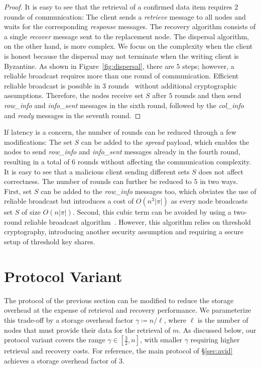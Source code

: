 \documentclass[sigconf,screen]{acmart}
\begin{document}
\begin{proof}
It is easy to see that the retrieval of a confirmed data item requires $2$ rounds of communication: The client sends a \emph{retrieve} message to all nodes and waits for the corresponding \emph{response} messages. The recovery algorithm consists of a single \emph{recover} message sent to the replacement node. The dispersal algorithm, on the other hand, is more complex. We focus on the complexity when the client is honest because the dispersal may not terminate when the writing client is Byzantine. As shown in Figure~\ref{fig:dispersal}, there are $5$ steps; however, a reliable broadcast requires more than one round of communication. Efficient reliable broadcast is possible in $3$ rounds~\cite{cachin2005, locher2024} without additional cryptographic assumptions. Therefore, the nodes receive set $S$ after $5$ rounds and then send \emph{row\_info} and \emph{info\_sent} messages in the sixth round, followed by the \emph{col\_info} and \emph{ready} messages in the seventh round.
\end{proof}

If latency is a concern, the number of rounds can be reduced through a few modifications: The set $S$ can be added to the \emph{spread} payload, which enables the nodes to send \emph{row\_info} and \emph{info\_sent} messages already in the fourth round, resulting in a total of $6$ rounds without affecting the communication complexity. It is easy to see that a malicious client sending different sets $S$ does not affect correctness.
The number of rounds can further be reduced to $5$ in two ways. First, set $S$ can be added to the \emph{row\_info} messages too, which obviates the use of reliable broadcast but introduces a cost of $O(n^3|\pi|)$ as every node broadcasts set $S$ of size $O(n|\pi|)$. Second, this cubic term can be avoided by using a two-round reliable broadcast algorithm~\cite{abraham2021, locher2024}. However, this algorithm relies on threshold cryptography, introducing another security assumption and requiring a secure setup of threshold key shares.

\section{Protocol Variant}
\label{sec:avid_msr}

The protocol of the previous section can be modified to reduce the storage overhead at the expense of retrieval and recovery performance. We parameterize this trade-off by a storage overhead factor $\gamma \coloneqq n/\ell$, where $\ell$ is the number of nodes that must provide their data for the retrieval of $m$. As discussed below, our protocol variant covers the range $\gamma \in [\frac{3}{2}, n]$, with smaller $\gamma$ requiring higher retrieval and recovery costs.
For reference, the main protocol of \S\ref{sec:avid} achieves a storage overhead factor of $3$.
\end{document}
